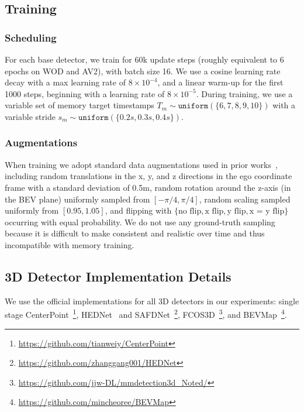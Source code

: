 \subsection{Training}

\subsubsection{Scheduling}

For each base detector, we train \ourmodel{} for 60k update steps (roughly equivalent to 6 epochs on WOD and AV2), with batch size 16.
We use a cosine learning rate decay with a max learning rate of $8 \times 10^{-4}$,
and a linear warm-up for the first 1000 steps, beginning with a learning
rate of $8 \times 10^{-5}$.
During training,
we use a variable set of memory target timestamps
$T_m \sim \texttt{uniform}(\{6, 7, 8, 9, 10\})$
with a variable stride $s_m \sim \texttt{uniform}(\{0.2s, 0.3s, 0.4s\})$.

\subsubsection{Augmentations}

When training \ourmodel{} we adopt standard data augmentations used in prior works~\cite{safdnet,hednet,wang2023dsvt},
including random translations in the x, y, and z directions in the ego coordinate frame with a standard deviation of 0.5m,
random rotation around the z-axis (in the BEV plane) uniformly sampled from $[-\pi/4, \pi/4]$,
random scaling sampled uniformly from $[0.95, 1.05]$,
and flipping with $\{\text{no flip}, \text{x flip}, \text{y flip}, \text{x = y flip}\}$
occurring with equal probability.
We do not use any ground-truth sampling~\cite{yan2018second} because
it is difficult to make consistent and realistic over time and thus incompatible with memory training.

\subsection{3D Detector Implementation Details} \label{sec:off-the-shelf-imp}

We use the official implementations for all 3D detectors in our experiments:
single stage CenterPoint~\cite{centerpoint}\footnote{\href{https://github.com/tianweiy/CenterPoint}{https://github.com/tianweiy/CenterPoint}},
HEDNet~\cite{hednet} and SAFDNet~\cite{safdnet}\footnote{\href{https://github.com/zhanggang001/HEDNet}{https://github.com/zhanggang001/HEDNet}},
FCOS3D~\cite{wang2021fcos3d}\footnote{\href{https://github.com/jjw-DL/mmdetection3d\_Noted/tree/master/configs/fcos3d}{https://github.com/jjw-DL/mmdetection3d\_Noted/}},
and BEVMap~\cite{chang2024bevmap}\footnote{\href{https://github.com/mincheoree/BEVMap}{https://github.com/mincheoree/BEVMap}}.

